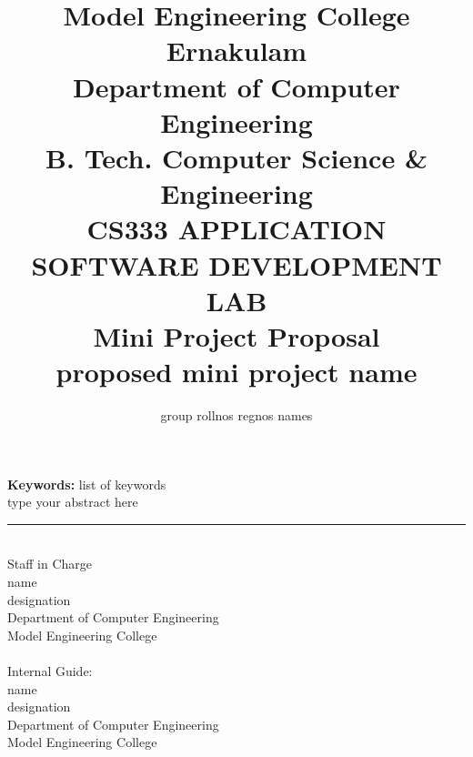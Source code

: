 \documentclass[twocolumn,10pt]{article}
\title{Model Engineering College Ernakulam
\\Department of Computer Engineering
\\B. Tech. Computer Science \& Engineering 
\\CS333 APPLICATION SOFTWARE DEVELOPMENT LAB           
\\ Mini Project Proposal
\\  proposed mini project name 
}
\author{  group rollnos regnos names  }
\begin{document}
\maketitle
	
{\bf Keywords:}
list of keywords\\
\abstract{} 
type your abstract here
\begin{thebibliography}{999}

\end{thebibliography}

\hrule
\vspace{.5in}

\\Staff in Charge \\
name \\
designation \\
Department of Computer Engineering \\
Model Engineering College \\

\\Internal Guide:\\
name \\
designation \\
Department of Computer Engineering \\
Model Engineering College \\
\end{document}
